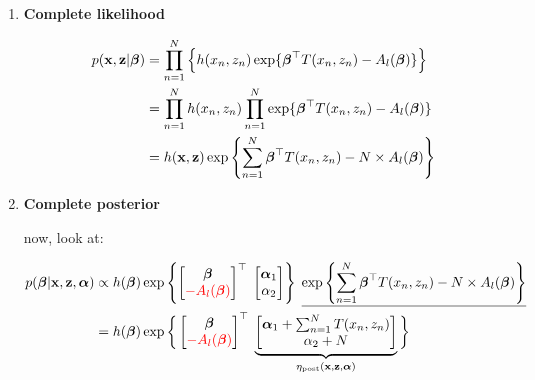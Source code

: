 \documentclass{article}
\def\post{\text{post}}
\begin{document}
\begin{enumerate}
\item {\bf Complete likelihood}

\begin{equation}\begin{split}
p({\mathbf x}, {\mathbf z} | \boldsymbol{\beta} ) &= \prod_{n=1}^{N} \Big\{ h(x_n,z_n) \exp\{ \boldsymbol{\beta}^\top T ( x_n, z_n) - A_l (\boldsymbol{\beta}) \} \Big\} \\
&= \prod_{n=1}^{N} h(x_n,z_n) \prod_{n=1}^{N} \exp\{ \boldsymbol{\beta}^\top T ( x_n, z_n) - A_l (\boldsymbol{\beta}) \}  \\
&= h({\mathbf x},{\mathbf z}) \exp\left\{ \sum_{n=1}^{N} \boldsymbol{\beta}^\top T ( x_n, z_n) - N \times A_l (\boldsymbol{\beta}) \right\} \\
\end{split}\end{equation}

\item {\bf Complete posterior}

now, look at:

\begin{equation}\begin{split}
p(\bbeta | \x, \z, \aalpha) 
&\propto h (\bbeta) \exp \left\{\begin{bmatrix} \bbeta \\ {\color{red} - A_l(\bbeta)} \end{bmatrix}^\top \;
\begin{bmatrix} \aalpha_1 \\ \alpha_2  \end{bmatrix} \right\}
\; \underline{\exp\left\{ \sum_{n=1}^{N} \bbeta^\top T ( x_n, z_n) - N \times A_l (\bbeta) \right\}}\\
&= 
h (\bbeta) \exp \bigg\{ \begin{bmatrix} \bbeta \\ {\color{red} - A_l(\bbeta)} \end{bmatrix}^\top \; \underbrace{\begin{bmatrix}  \aalpha_1 + \sum_{n=1}^{N}  T ( x_n, z_n)  \\ \alpha_2  + N \end{bmatrix}}_{\eta_\post(\x,\z,\aalpha)} \bigg\}  \\
\end{split}\end{equation}




\end{enumerate}
\end{document}
